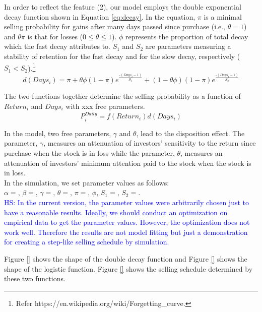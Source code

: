 \documentclass[11pt, a4paper]{article}
\newcommand{\HS}[1]{\textcolor{blue}{HS: #1}}
\begin{document}
\vspace*{0.5cm}
In order to reflect the feature (2), our model employs the double exponential decay function shown in Equation \ref{eq:decay}. In the equation, $\pi$ is a minimal selling probability for gains after many days passed since purchase (i.e., $\theta=1$) and $\theta \pi$ is that for losses ($0\leq \theta \leq 1$). $\phi$ represents the proportion of total decay which the fast decay attributes to. $S_1$ and $S_2$ are parameters measuring a stability of retention for the fast decay and for the slow decay, respectively ($S_1<S_2$).\footnote{Refer https://en.wikipedia.org/wiki/Forgetting\_curve.}
\begin{equation}
\label{eq:decay}
d(Days_i) = \pi + \theta \phi (1-\pi) e^{\frac{\mbox{-}(Days_i-1)}{S_1}} + (1-\theta \phi) (1-\pi) e^{\frac{\mbox{-}(Days_i-1)}{S_2}}
\end{equation}

\vspace*{0.5cm}
The two functions together determine the selling probability as a function of $Return_i$ and $Days_i$ with xxx free parameters.
\begin{equation}
\label{eq:sell}
P^{Daily}_{i} = f(Return_i)d(Days_i)
\end{equation}

\vspace*{0.5cm}
In the model, two free parameters, $\gamma$ and $\theta$, lead to the disposition effect. The parameter, $\gamma$,  measures an attenuation of investors' sensitivity to the return since purchase when the stock is in loss while the parameter, $\theta$, measures an attenuation of investors' minimum attention paid to the stock when the stock is in loss. \\

In the simulation, we set parameter values as follows:\\
$\alpha=$, $\beta=$, $\gamma=$, $\theta=$, $\pi=$, $\phi$, $S_1=$, $S_2=$. \\
\HS{In the current version, the parameter values were arbitrarily chosen just to have a reasonable results. Ideally, we should conduct an optimization on empirical data to get the parameter values. However, the optimization does not work well. Therefore the results are not model fitting but just a demonstration for creating a step-like selling schedule by simulation.}

Figure \ref{} shows the shape of the double decay function and Figure \ref{} shows the shape of the logistic function.
Figure \ref{} shows the selling schedule determined by these two functions.
\end{document}
